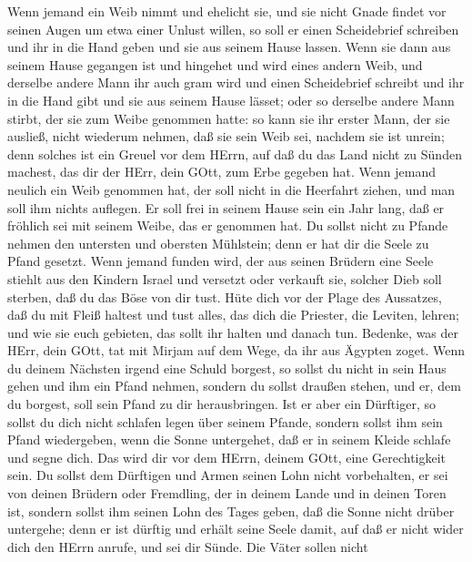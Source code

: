  Wenn jemand ein Weib nimmt und ehelicht sie, und sie nicht
Gnade findet vor seinen Augen um etwa einer Unlust willen, so soll er
einen Scheidebrief schreiben und ihr in die Hand geben und sie aus
seinem Hause lassen.  Wenn sie dann aus seinem Hause
gegangen ist und hingehet und wird eines andern Weib,  und
derselbe andere Mann ihr auch gram wird und einen Scheidebrief schreibt
und ihr in die Hand gibt und sie aus seinem Hause lässet; oder so
derselbe andere Mann stirbt, der sie zum Weibe genommen hatte:
 so kann sie ihr erster Mann, der sie ausließ, nicht
wiederum nehmen, daß sie sein Weib sei, nachdem sie ist unrein; denn
solches ist ein Greuel vor dem HErrn, auf daß du das Land nicht zu
Sünden machest, das dir der HErr, dein GOtt, zum Erbe gegeben hat.
 Wenn jemand neulich ein Weib genommen hat, der soll nicht
in die Heerfahrt ziehen, und man soll ihm nichts auflegen. Er soll frei
in seinem Hause sein ein Jahr lang, daß er fröhlich sei mit seinem
Weibe, das er genommen hat.  Du sollst nicht zu Pfande
nehmen den untersten und obersten Mühlstein; denn er hat dir die Seele
zu Pfand gesetzt.  Wenn jemand funden wird, der aus seinen
Brüdern eine Seele stiehlt aus den Kindern Israel und versetzt oder
verkauft sie, solcher Dieb soll sterben, daß du das Böse von dir tust.
 Hüte dich vor der Plage des Aussatzes, daß du mit Fleiß
haltest und tust alles, das dich die Priester, die Leviten, lehren; und
wie sie euch gebieten, das sollt ihr halten und danach tun. 
Bedenke, was der HErr, dein GOtt, tat mit Mirjam auf dem Wege, da ihr
aus Ägypten zoget.  Wenn du deinem Nächsten irgend eine
Schuld borgest, so sollst du nicht in sein Haus gehen und ihm ein Pfand
nehmen,  sondern du sollst draußen stehen, und er, dem du
borgest, soll sein Pfand zu dir herausbringen.  Ist er aber
ein Dürftiger, so sollst du dich nicht schlafen legen über seinem
Pfande,  sondern sollst ihm sein Pfand wiedergeben, wenn
die Sonne untergehet, daß er in seinem Kleide schlafe und segne dich.
Das wird dir vor dem HErrn, deinem GOtt, eine Gerechtigkeit sein.
 Du sollst dem Dürftigen und Armen seinen Lohn nicht
vorbehalten, er sei von deinen Brüdern oder Fremdling, der in deinem
Lande und in deinen Toren ist,  sondern sollst ihm seinen
Lohn des Tages geben, daß die Sonne nicht drüber untergehe; denn er ist
dürftig und erhält seine Seele damit, auf daß er nicht wider dich den
HErrn anrufe, und sei dir Sünde.  Die Väter sollen nicht
